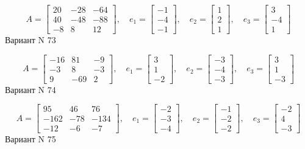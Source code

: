 \documentclass[11pt]{report}
\begin{document}
$$A = \left[\begin{matrix}20 & -28 & -64\\40 & -48 & -88\\-8 & 8 & 12\end{matrix}\right],\quad e_1 = \left[\begin{matrix}-1\\-4\\-1\end{matrix}\right],\quad e_2 = \left[\begin{matrix}1\\2\\1\end{matrix}\right],\quad e_3 = \left[\begin{matrix}3\\-4\\1\end{matrix}\right]$$Вариант N 73

$$A = \left[\begin{matrix}-16 & 81 & -9\\-3 & 8 & -3\\9 & -69 & 2\end{matrix}\right],\quad e_1 = \left[\begin{matrix}3\\1\\-2\end{matrix}\right],\quad e_2 = \left[\begin{matrix}-3\\-4\\-3\end{matrix}\right],\quad e_3 = \left[\begin{matrix}3\\1\\-3\end{matrix}\right]$$Вариант N 74

$$A = \left[\begin{matrix}95 & 46 & 76\\-162 & -78 & -134\\-12 & -6 & -7\end{matrix}\right],\quad e_1 = \left[\begin{matrix}-2\\-3\\-4\end{matrix}\right],\quad e_2 = \left[\begin{matrix}-1\\-2\\-2\end{matrix}\right],\quad e_3 = \left[\begin{matrix}-2\\4\\-3\end{matrix}\right]$$Вариант N 75
\end{document}
